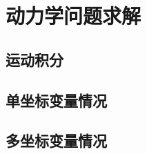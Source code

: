

\section{动力学问题求解}\label{3-5}

\subsection{运动积分}\label{3-5-1}

\subsection{单坐标变量情况}\label{3-5-2}

\subsection{多坐标变量情况}\label{3-5-3}